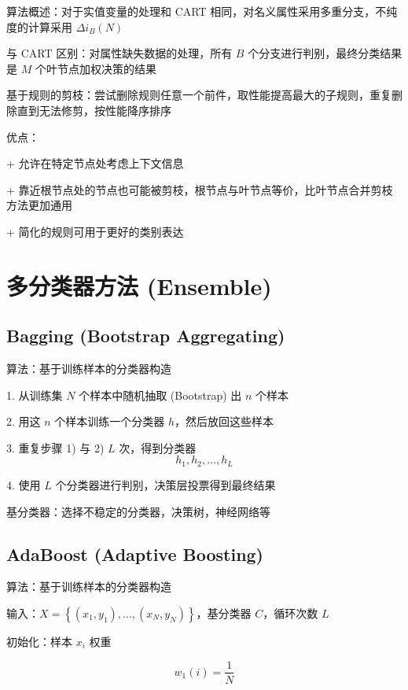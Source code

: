 \documentclass[openany,a4paper,12pt]{ctexbook}
\theoremstyle{kaiti}
\theoremstyle{normal}
\begin{document}
算法概述：对于实值变量的处理和 CART 相同，对名义属性采用多重分支，不纯度的计算采用 $\Delta i_B\left(N \right)$

与 CART 区别：对属性缺失数据的处理，所有 $B$ 个分支进行判别，最终分类结果是 $M$ 个叶节点加权决策的结果

基于规则的剪枝：尝试删除规则任意一个前件，取性能提高最大的子规则，重复删除直到无法修剪，按性能降序排序

优点：

+ 允许在特定节点处考虑上下文信息

+ 靠近根节点处的节点也可能被剪枝，根节点与叶节点等价，比叶节点合并剪枝方法更加通用

+ 简化的规则可用于更好的类别表达

\chapter{多分类器方法 (Ensemble) }

\section{Bagging (Bootstrap Aggregating)}

算法：基于训练样本的分类器构造

1. 从训练集 $N$ 个样本中随机抽取 (Bootstrap) 出 $n$ 个样本

2. 用这 $n$ 个样本训练一个分类器 $h$，然后放回这些样本

3. 重复步骤 1) 与 2) $L$ 次，得到分类器 
\begin{equation}
  h_1, h_2,\dots ,h_L
\end{equation}

4. 使用 $L$ 个分类器进行判别，决策层投票得到最终结果

基分类器：选择不稳定的分类器，决策树，神经网络等

\section{AdaBoost (Adaptive Boosting)}

算法：基于训练样本的分类器构造

输入：$X=\left\{ \left(x_1,y_1 \right),\dots ,\left(x_N,y_N \right)\right\}$，基分类器 $C$，循环次数 $L$

初始化：样本 $x_i$ 权重

\begin{equation}
w_1(i)=\frac{1}{N}
\end{equation}
\end{document}
